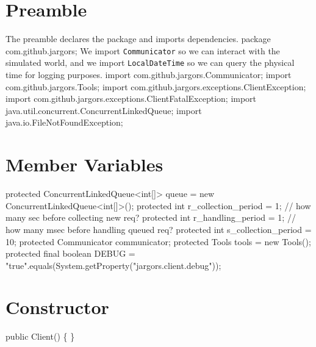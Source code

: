 \section{Preamble}
The preamble declares the package and imports dependencies.
\nwenddocs{}\endmoddef{}
package com.github.jargors;
\nwendcode{}\nwdocspar
We import {\tt{}Communicator} so we can interact with the simulated world,
and we import {\tt{}LocalDateTime} so we can query the physical time for
logging purposes.
\nwenddocs{}\plusendmoddef
import com.github.jargors.Communicator;
import com.github.jargors.Tools;
import com.github.jargors.exceptions.ClientException;
import com.github.jargors.exceptions.ClientFatalException;
import java.util.concurrent.ConcurrentLinkedQueue;
import java.io.FileNotFoundException;
\nwendcode{}\nwdocspar

\section{Member Variables}
\nwenddocs{}\endmoddef{}
protected ConcurrentLinkedQueue<int[]> queue = new ConcurrentLinkedQueue<int[]>();
protected int r_collection_period = 1;  // how many sec before collecting new req?
protected int r_handling_period = 1;  // how many msec before handling queued req?
protected int s_collection_period = 10;
protected Communicator communicator;
protected Tools tools = new Tools();
protected final boolean DEBUG =
    "true".equals(System.getProperty("jargors.client.debug"));
\nwendcode{}\nwdocspar

\section{Constructor}
\nwenddocs{}\endmoddef{}
public Client() \{ \}
\nwendcode{}\nwdocspar

